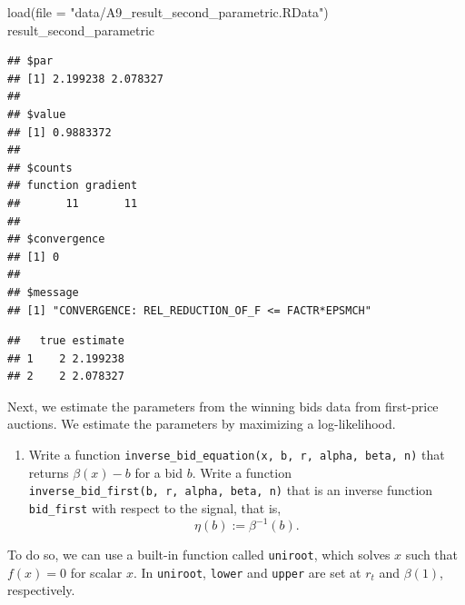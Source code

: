 \documentclass[
]{book}
\newenvironment{Shaded}{\begin{snugshade}}{\end{snugshade}}
\newcommand{\AttributeTok}[1]{\textcolor[rgb]{0.77,0.63,0.00}{#1}}
\newcommand{\FunctionTok}[1]{\textcolor[rgb]{0.00,0.00,0.00}{#1}}
\newcommand{\NormalTok}[1]{#1}
\newcommand{\OtherTok}[1]{\textcolor[rgb]{0.56,0.35,0.01}{#1}}
\newcommand{\SpecialCharTok}[1]{\textcolor[rgb]{0.00,0.00,0.00}{#1}}
\newcommand{\StringTok}[1]{\textcolor[rgb]{0.31,0.60,0.02}{#1}}
\providecommand{\tightlist}{%
  \setlength{\itemsep}{0pt}\setlength{\parskip}{0pt}}
\begin{document}
\begin{Shaded}
\begin{Highlighting}[]
\FunctionTok{load}\NormalTok{(}\AttributeTok{file =} \StringTok{"data/A9\_result\_second\_parametric.RData"}\NormalTok{)}
\NormalTok{result\_second\_parametric}
\end{Highlighting}
\end{Shaded}

\begin{verbatim}
## $par
## [1] 2.199238 2.078327
## 
## $value
## [1] 0.9883372
## 
## $counts
## function gradient 
##       11       11 
## 
## $convergence
## [1] 0
## 
## $message
## [1] "CONVERGENCE: REL_REDUCTION_OF_F <= FACTR*EPSMCH"
\end{verbatim}

\begin{Shaded}
\end{Shaded}

\begin{verbatim}
##   true estimate
## 1    2 2.199238
## 2    2 2.078327
\end{verbatim}

Next, we estimate the parameters from the winning bids data from first-price auctions. We estimate the parameters by maximizing a log-likelihood.

\begin{enumerate}
\def\labelenumi{\arabic{enumi}.}
\setcounter{enumi}{4}
\tightlist
\item
  Write a function \texttt{inverse\_bid\_equation(x,\ b,\ r,\ alpha,\ beta,\ n)} that returns \(\beta(x) - b\) for a bid \(b\). Write a function \texttt{inverse\_bid\_first(b,\ r,\ alpha,\ beta,\ n)} that is an inverse function \texttt{bid\_first} with respect to the signal, that is,
  \[
  \eta(b) := \beta^{-1}(b).
  \]
\end{enumerate}

To do so, we can use a built-in function called \texttt{uniroot}, which solves \(x\) such that \(f(x) = 0\) for scalar \(x\). In \texttt{uniroot}, \texttt{lower} and \texttt{upper} are set at \(r_t\) and \(\beta(1)\), respectively.
\end{document}
